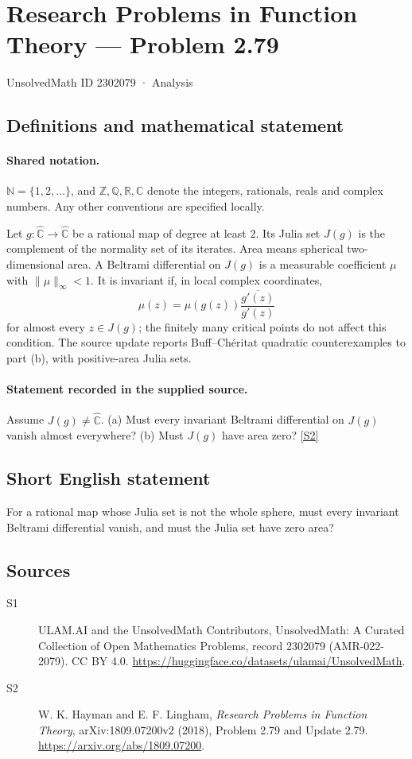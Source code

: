 \documentclass[11pt]{article}
\newcommand{\sref}[2]{\hyperlink{source:#1:#2}{[S#2]}}
\begin{document}
\setcounter{section}{2302078}
\section{Research Problems in Function Theory — Problem 2.79}\label{2302079}
{\small\sffamily UnsolvedMath ID 2302079 · Analysis}
\subsection{Definitions and mathematical statement}

\paragraph{Shared notation.}$\mathbb N=\{1,2,\ldots\}$, and $\mathbb Z,\mathbb Q,\mathbb R,\mathbb C$ denote the integers, rationals, reals and complex numbers. Any other conventions are specified locally.


Let $g:\widehat{\mathbb C}\to\widehat{\mathbb C}$ be a rational map of degree at least $2$. Its Julia set $J(g)$ is the complement of the normality set of its iterates. Area means spherical two-dimensional area. A Beltrami differential on $J(g)$ is a measurable coefficient $\mu$ with $\|\mu\|_\infty<1$. It is invariant if, in local complex coordinates,
\[\mu(z)=\mu(g(z))\frac{\overline{g'(z)}}{g'(z)}\]
for almost every $z\in J(g)$; the finitely many critical points do not affect this condition.
The source update reports Buff--Ch\'eritat quadratic counterexamples to part (b), with positive-area Julia sets.
\paragraph{Statement recorded in the supplied source.}
Assume $J(g)\ne\widehat{\mathbb C}$. (a) Must every invariant Beltrami differential on $J(g)$ vanish almost everywhere? (b) Must $J(g)$ have area zero? \sref{2302079}{2}
\subsection{Short English statement}
For a rational map whose Julia set is not the whole sphere, must every invariant Beltrami differential vanish, and must the Julia set have zero area?
\subsection{Sources}
\begin{description}
\item[\hypertarget{source:2302079:1}{S1}] ULAM.AI and the UnsolvedMath Contributors, UnsolvedMath: A Curated Collection of Open Mathematics Problems, record 2302079 (AMR-022-2079). CC BY 4.0. \url{https://huggingface.co/datasets/ulamai/UnsolvedMath}.
\item[\hypertarget{source:2302079:2}{S2}] W. K. Hayman and E. F. Lingham, \emph{Research Problems in Function Theory}, arXiv:1809.07200v2 (2018), Problem 2.79 and Update 2.79. \url{https://arxiv.org/abs/1809.07200}.
\end{description}
\label{end:2302079}
\end{document}
